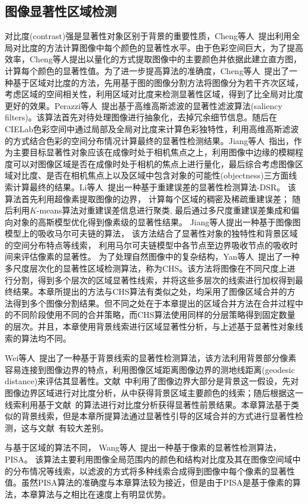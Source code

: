 \subsection{图像显著性区域检测}
\label{sec:SaliencyDetection}
对比度(contrast)强是显著性对象区别于背景的重要性质，Cheng等人~\cite{ChengPAMI}提出利用全局对比度的方法计算图像中每个颜色的显著性水平。由于色彩空间巨大，为了提高效率，Cheng等人提出以量化的方式提取图像中的主要颜色并依据此建立直方图，计算每个颜色的显著性值。为了进一步提高算法的准确度，Cheng等人~\cite{ChengPAMI}提出了一种基于区域对比度的方法，先用基于图的图像分割方法将图像分为若干齐次区域，考虑区域的空间相关性，利用区域对比度来检测显著性区域，得到了比全局对比度更好的效果。Perazzi等人~\cite{saliencyFilter}提出基于高维高斯滤波的显著性滤波算法(saliency filters)。该算法首先对待处理图像进行抽象化，去掉冗余细节信息。随后在CIELab色彩空间中通过局部及全局对比度来计算色彩独特性，利用高维高斯滤波的方式结合色彩的空间分布情况计算最终的显著性检测结果。Jiang等人~\cite{ufo}指出，作为主要目标显著性对象应该在成像时处于相机焦点之上，利用图像中边缘的模糊程度可以对图像区域是否在成像时处于相机的焦点上进行量化，最后综合考虑图像区域对比度、是否在相机焦点上以及区域中包含对象的可能性(objectness)三方面线索计算最终的结果。Li等人~\cite{DSR}提出一种基于重建误差的显著性检测算法-DSR。 该算法首先利用超像素提取图像的边界， 计算每个区域的稠密及稀疏重建误差； 随后利用$K$-means算法对重建误差信息进行聚类, 最后通过多尺度重建误差集成和偏向对象的高斯模型优化得到像素级的显著性结果。 Jiang等人\cite{MC}提出一种基于图像图模型上的吸收马尔可夫链的算法， 该方法结合了显著性对象的独特性和背景区域的空间分布特点等线索， 利用马尔可夫链模型中各节点至边界吸收节点的吸收时间来评估像素的显著性。 为了处理自然图像中的复杂结构，Yan等人~\cite{ECSSD}提出了一种多尺度层次化的显著性区域检测算法，称为CHS。该方法将图像在不同尺度上进行分割，得到多个层次的区域显著性线索，并将这些多层次的线索进行加权得到最终结果。本章所提出的方法与CHS算法有类似之处，均采用了图像区域合并的方法得到多个图像分割结果。但不同之处在于本章提出的区域合并方法在合并过程中的不同阶段使用不同的合并策略，而CHS算法使用同样的分层策略得到固定数量的层次。并且，本章使用背景线索进行区域显著性分析，与上述基于显著性对象线索的算法均不同。\par
Wei等人~\cite{geodesicDistance}提出了一种基于背景线索的显著性检测算法，该方法利用背景部分像素容易连接到图像边界的特点，利用图像区域距离图像边界的测地线距离(geodesic distance)来评估其显著性。文献~中利用了图像边界大部分是背景这一假设，先对图像边界区域进行对比度分析，从中获得背景区域主要颜色的线索；随后根据这一线索利用基于文献~的算法进行对比度分析获得显著性前景结果。本章算法基于类似的背景线索，但是本章所提算法通过显著性引导的区域合并的方式进行显著性检测，这与文献~有较大差别。\par
与基于区域的算法不同， Wang等人~\cite{PISA}提出一种基于像素的显著性检测算法， PISA。 该算法主要利用图像全局范围内的颜色和结构对比度及其在图像空间域中的分布情况等线索，以滤波的方式将多种线索合成得到图像中每个像素的显著性值。虽然PISA算法的准确度与本章算法较为接近，但是由于PISA是基于像素的算法，本章算法与之相比在速度上有明显优势。

